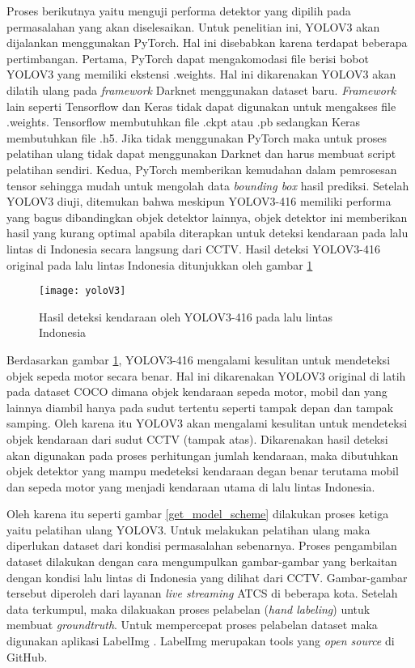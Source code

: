 \documentclass[../thesis.tex]{subfiles}
\begin{document}
Proses berikutnya yaitu menguji performa detektor yang dipilih pada permasalahan yang akan diselesaikan. Untuk penelitian ini, YOLOV3 akan dijalankan menggunakan PyTorch. Hal ini disebabkan karena terdapat beberapa pertimbangan. Pertama, PyTorch dapat mengakomodasi file berisi bobot YOLOV3 yang memiliki ekstensi .weights. Hal ini dikarenakan YOLOV3 akan dilatih ulang pada \textit{framework} Darknet menggunakan dataset baru. \textit{Framework} lain seperti Tensorflow dan Keras tidak dapat digunakan untuk mengakses file .weights. Tensorflow membutuhkan file .ckpt atau .pb sedangkan Keras membutuhkan file .h5. Jika tidak menggunakan PyTorch maka untuk proses pelatihan ulang
tidak dapat menggunakan Darknet dan harus membuat script pelatihan sendiri. Kedua, PyTorch memberikan kemudahan dalam pemrosesan tensor sehingga mudah untuk mengolah data \textit{bounding box} hasil prediksi.
Setelah YOLOV3 diuji, ditemukan bahwa meskipun YOLOV3-416 memiliki performa yang bagus dibandingkan objek detektor lainnya, objek detektor ini memberikan hasil yang kurang optimal apabila diterapkan untuk deteksi kendaraan pada lalu lintas di Indonesia secara langsung dari CCTV. Hasil deteksi YOLOV3-416 original pada lalu lintas Indonesia ditunjukkan oleh gambar \ref{yoloV3_ori}

\begin{figure}[htp]
	\centering
	\texttt{[image: yoloV3]}
	\caption{Hasil deteksi kendaraan oleh YOLOV3-416 pada lalu lintas Indonesia}
	\label{yoloV3_ori}
\end{figure}
Berdasarkan gambar \ref{yoloV3_ori}, YOLOV3-416 mengalami kesulitan untuk mendeteksi objek sepeda motor secara benar. Hal ini dikarenakan YOLOV3 original di latih pada dataset COCO dimana objek kendaraan sepeda motor, mobil dan yang lainnya diambil hanya pada sudut tertentu seperti tampak depan dan tampak samping. Oleh karena itu YOLOV3 akan mengalami kesulitan untuk mendeteksi objek kendaraan dari sudut CCTV (tampak atas). 
Dikarenakan hasil deteksi akan digunakan pada proses perhitungan jumlah kendaraan, maka dibutuhkan objek detektor yang mampu medeteksi kendaraan degan benar terutama mobil dan sepeda motor yang menjadi kendaraan utama di lalu lintas Indonesia.

Oleh karena itu seperti gambar \ref{get_model_scheme} dilakukan proses ketiga yaitu pelatihan ulang YOLOV3. Untuk melakukan pelatihan ulang maka diperlukan dataset dari kondisi permasalahan sebenarnya. Proses pengambilan dataset dilakukan dengan cara mengumpulkan gambar-gambar yang berkaitan dengan kondisi lalu lintas di Indonesia yang dilihat dari CCTV. Gambar-gambar tersebut diperoleh dari layanan \textit{live streaming} ATCS di beberapa kota. 
Setelah data terkumpul, maka dilakuakan proses pelabelan (\textit{hand labeling}) untuk membuat \textit{groundtruth}. Untuk mempercepat proses pelabelan dataset maka digunakan aplikasi LabelImg \cite{LabelImg}. LabelImg merupakan tools yang \textit{open source} di GitHub.
\end{document}
